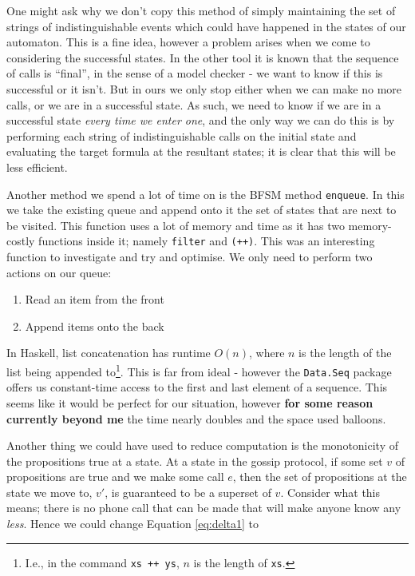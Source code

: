 \documentclass[12pt, a4paper]{article}
\begin{document}

One might ask why we don't copy this method of simply maintaining the set of
strings of indistinguishable events which could have happened in the states of
our automaton. This is a fine idea, however a problem arises when we come to
considering the successful states. In the other tool it is known that the
sequence of calls is ``final'', in the sense of a model checker - we want to
know if this is successful or it isn't. But in ours we only stop either when we
can make no more calls, or we are in a successful state. As such, we need to
know if we are in a successful state \textit{every time we enter one}, and the
only way we can do this is by performing each string of indistinguishable calls
on the initial state and evaluating the target formula at the resultant states;
it is clear that this will be less efficient.

\bigskip

Another method we spend a lot of time on is the BFSM method \texttt{enqueue}. In
this we take the existing queue and append onto it the set of states that are
next to be visited. This function uses a lot of memory and time as it has two
memory-costly functions inside it; namely \texttt{filter} and \texttt{(++)}.
This was an interesting function to investigate and try and optimise. We only
need to perform two actions on our queue:

\begin{enumerate}
\item Read an item from the front
\item Append items onto the back
\end{enumerate}

In Haskell, list concatenation has runtime $O(n)$, where $n$ is the length of
the list being appended to\footnote{I.e., in the command \texttt{xs ++ ys}, $n$
  is the length of \texttt{xs}.}. This is far from ideal - however the
\texttt{Data.Seq} package offers us constant-time access to the first and last
element of a sequence. This seems like it would be perfect for our situation,
however \textbf{for some reason currently beyond me} the time nearly doubles and
the space used balloons.

\bigskip

Another thing we could have used to reduce computation is the monotonicity of
the propositions true at a state. At a state in the gossip protocol, if some set
$v$ of propositions are true and we make some call $e$, then the set of
propositions at the state we move to, $v'$, is guaranteed to be a superset of
$v$. Consider what this means; there is no phone call that can be made that will
make anyone know any \textit{less}. Hence we could change Equation
\ref{eq:delta1} to
\end{document}
